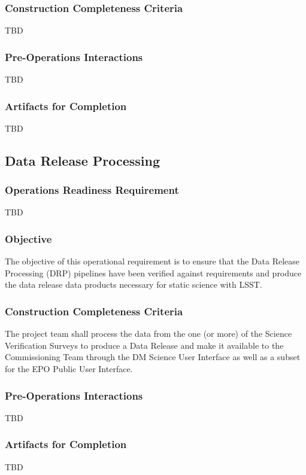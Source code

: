 \subsubsection{Construction Completeness Criteria}
TBD

\subsubsection{Pre-Operations Interactions}
TBD

\subsubsection{Artifacts for Completion}
TBD


\subsection{Data Release Processing}

\subsubsection{Operations Readiness Requirement}
TBD

\subsubsection{Objective}
The objective of this operational requirement is to ensure that the Data Release Processing (DRP) pipelines have been verified against requirements and produce the data release data products necessary for static science with LSST. 


\subsubsection{Construction Completeness Criteria}
The project team shall process the data from the one (or more) of the Science Verification Surveys to produce a Data Release and make it available to the Commissioning Team through the DM Science User Interface as well as a subset for the EPO Public User Interface.

\subsubsection{Pre-Operations Interactions}
TBD

\subsubsection{Artifacts for Completion}
TBD

